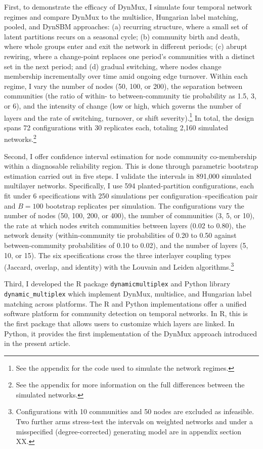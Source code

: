 \documentclass[11pt, letterpaper]{article}
\begin{document}
First, to demonstrate the efficacy of DynMux, I simulate four temporal network regimes and compare DynMux to the multislice, Hungarian label matching, pooled, and DynSBM approaches: (a) recurring structure, where a small set of latent partitions recurs on a seasonal cycle; (b) community birth and death, where whole groups enter and exit the network in different periods; (c) abrupt rewiring, where a change-point replaces one period's communities with a distinct set in the next period; and (d) gradual switching, where nodes change membership incrementally over time amid ongoing edge turnover. Within each regime, I vary the number of nodes (50, 100, or 200), the separation between communities (the ratio of within- to between-community tie probability as 1.5, 3, or 6), and the intensity of change (low or high, which governs the number of layers and the rate of switching, turnover, or shift severity).\footnote{See the appendix for the code used to simulate the network regimes.} In total, the design spans 72 configurations with 30 replicates each, totaling 2,160 simulated networks.\footnote{See the appendix for more information on the full differences between the simulated networks.}

Second, I offer confidence interval estimation for node community co-membership within a diagnosable reliability region. This is done through parametric bootstrap estimation carried out in five steps. I validate the intervals in 891,000 simulated multilayer networks. Specifically, I use 594 planted-partition configurations, each fit under 6 specifications with 250 simulations per configuration--specification pair and $B = 100$ bootstrap replicates per simulation. The configurations vary the number of nodes (50, 100, 200, or 400), the number of communities (3, 5, or 10), the rate at which nodes switch communities between layers (0.02 to 0.80), the network density (within-community tie probabilities of 0.20 to 0.50 against between-community probabilities of 0.10 to 0.02), and the number of layers (5, 10, or 15). The six specifications cross the three interlayer coupling types (Jaccard, overlap, and identity) with the Louvain and Leiden algorithms.\footnote{Configurations with 10 communities and 50 nodes are excluded as infeasible. Two further arms stress-test the intervals on weighted networks and under a misspecified (degree-corrected) generating model are in appendix section XX.}

Third, I developed the R package \texttt{dynamicmultiplex} and Python library \texttt{dynamic\_multiplex} which implement DynMux, multislice, and Hungarian label matching across platforms. The R and Python implementations offer a unified software platform for  community detection on temporal networks. In R, this is the first package that allows users to customize which layers are linked. In Python, it provides the first implementation of the DynMux approach introduced in the present article.
\end{document}
